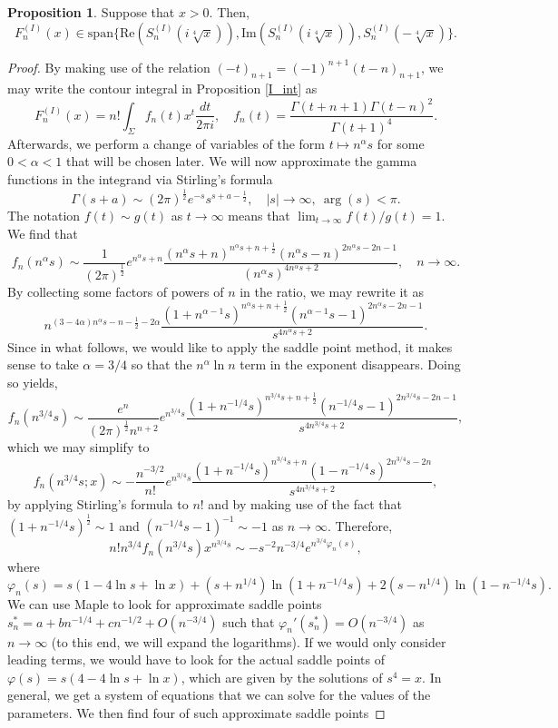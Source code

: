 \documentclass[a4paper,12pt,oneside]{article}
\theoremstyle{definition}
\newtheorem{prop}[defi]{Proposition}
\newcommand{\p}{\varphi}
\begin{document}
\begin{prop} \label{I_AQ_error}
    Suppose that $x>0$. Then,
    $$F_{n}^{(I)}(x) \in\text{span}\{\text{Re}(S_{n}^{(I)}(i\sqrt[4]{x})),\text{Im}(S_{n}^{(I)}(i\sqrt[4]{x})),S_n^{(I)}(-\sqrt[4]{x})\}.$$     
\end{prop}
\begin{proof}
By making use of the relation $(-t)_{n+1} = (-1)^{n+1} (t-n)_{n+1}$, we may write the contour integral in Proposition \ref{I_int} as 
    $$F_n^{(I)}(x) = n! \int_{\Sigma} f_n(t) x^t \frac{dt}{2\pi i},\quad f_n(t) = \frac{\Gamma(t+n+1)\Gamma(t-n)^2}{\Gamma(t+1)^4}.$$
Afterwards, we perform a change of variables of the form $t\mapsto n^{\alpha} s$ for some $0<\alpha<1$ that will be chosen later. We will now approximate the gamma functions in the integrand via Stirling's formula
    $$\Gamma(s+a) \sim (2\pi)^{\frac{1}{2}} e^{-s} s^{s+a-\frac{1}{2}},\quad |s|\to\infty,\ \arg(s) < \pi. $$
The notation $f(t)\sim g(t)$ as $t\to\infty$ means that $\lim_{t\to\infty }f(t)/g(t) = 1$. We find that
$$f_n(n^{\alpha}s) \sim \frac{1}{(2\pi)^{\frac{1}{2}}} e^{n^{\alpha}s+n} \frac{(n^{\alpha}s+n)^{n^{\alpha}s+n+\frac{1}{2}} (n^{\alpha}s-n)^{2n^{\alpha}s-2n-1}}{(n^{\alpha}s)^{4n^{\alpha}s+2}},\quad n\to\infty. $$
By collecting some factors of powers of $n$ in the ratio, we may rewrite it as 
$$ n^{(3-4\alpha)n^{\alpha}s - n - \frac{1}{2} -2\alpha} \frac{(1+n^{\alpha-1}s)^{n^{\alpha}s+n+\frac{1}{2}} (n^{\alpha-1}s-1)^{2n^{\alpha}s-2n-1}}{s^{4n^{\alpha}s+2}}. $$
Since in what follows, we would like to apply the saddle point method, it makes sense to take $\alpha=3/4$ so that the $n^\alpha \ln n$ term in the exponent disappears. Doing so yields,
$$f_n(n^{3/4}s) \sim \frac{e^{n}}{(2\pi)^{\frac{1}{2}} n^{n+2}} e^{n^{3/4}s} \frac{(1+n^{-1/4}s)^{n^{3/4}s+n+\frac{1}{2}} (n^{-1/4}s-1)^{2n^{3/4}s-2n-1}}{s^{4n^{3/4}s+2}}, $$
which we may simplify to
$$f_n(n^{3/4}s;x) \sim - \frac{n^{-3/2}}{n!} e^{n^{3/4}s} \frac{(1+n^{-1/4}s)^{n^{3/4}s+n} (1-n^{-1/4}s)^{2n^{3/4}s-2n}}{s^{4n^{3/4}s+2}}, $$
by applying Stirling's formula to $n!$ and by making use of the fact that $(1+n^{-1/4}s)^{\frac{1}{2}}\sim 1$ and $(n^{-1/4}s-1)^{-1}\sim -1$ as $n\to\infty$. Therefore,
$$ n! n^{3/4} f_n(n^{3/4}s) x^{n^{3/4}s} \sim - s^{-2} n^{-3/4} e^{n^{3/4}\p_n(s)},  $$
where
    $$\p_n(s) = s(1-4\ln s+\ln x) + (s+n^{1/4})\ln(1+n^{-1/4}s) + 2 (s-n^{1/4}) \ln(1-n^{-1/4}s).$$  
We can use Maple to look for approximate saddle points $s^\ast_n = a+bn^{-1/4}+cn^{-1/2}+O(n^{-3/4})$ such that $\p_n'(s^\ast_n)=O(n^{-3/4})$ as $n\to\infty$ (to this end, we will expand the logarithms). If we would only consider leading terms, we would have to look for the actual saddle points of $\p(s)=s(4-4\ln s+\ln x)$, which are given by the solutions of $s^4=x$. In general, we get a system of equations that we can solve for the values of the parameters. We then find four of such approximate saddle points

\end{proof}
\end{document}
